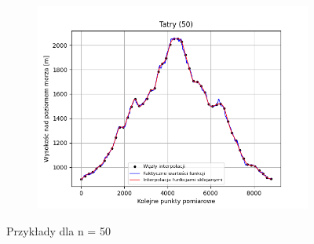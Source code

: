 \documentclass[fleqn]{article}
\begin{document}
\begin{figure}[h]
\begin{subfigure}{.33\textwidth}
          \includegraphics[width=\linewidth]{plot_50_points_Tatry.png}
          \label{fig:sub3}
        \end{subfigure}
        \caption{Przykłady dla n = 50}
        \label{fig:test}
    \end{figure}
\end{document}
